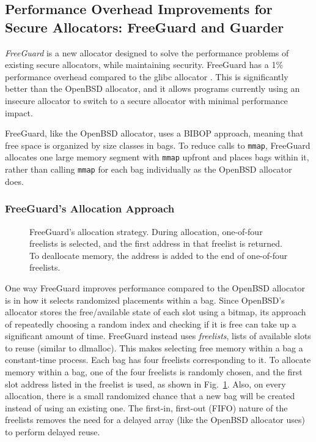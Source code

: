 \documentclass[conference]{IEEEtran}
\begin{document}
\subsection{Performance Overhead Improvements for Secure Allocators: FreeGuard and Guarder}


\emph{FreeGuard} is a new allocator designed to solve the performance problems of existing secure allocators, while maintaining security.
FreeGuard has a 1\% performance overhead compared to the glibc allocator \cite{guarder}.
This is significantly better than the OpenBSD allocator, and it allows programs currently using an insecure allocator to switch to a secure allocator with minimal performance impact.

FreeGuard, like the OpenBSD allocator, uses a BIBOP approach, meaning that free space is organized by size classes in bags.
To reduce calls to \verb|mmap|, FreeGuard allocates one large memory segment with \verb|mmap| upfront and places bags within it, rather than calling \verb|mmap| for each bag individually as the OpenBSD allocator does.

\subsubsection{FreeGuard's Allocation Approach}

\begin{figure}
	\def\svgwidth{3.5in}
	
	\caption{
		FreeGuard's allocation strategy.
		During allocation, one-of-four freelists is selected, and the first address in that freelist is returned.
		To deallocate memory, the address is added to the end of one-of-four freelists.
		\label{fig:freeguard_allocation}}
\end{figure}

One way FreeGuard improves performance compared to the OpenBSD allocator is in how it selects randomized placements within a bag.
Since OpenBSD's allocator stores the free/available state of each slot using a bitmap, its approach of repeatedly choosing a random index and checking if it is free can take up a significant amount of time.
FreeGuard instead uses \emph{freelists}, lists of available slots to reuse (similar to dlmalloc).
This makes selecting free memory within a bag a constant-time process.
Each bag has four freelists corresponding to it.
To allocate memory within a bag, one of the four freelists is randomly chosen, and the first slot address listed in the freelist is used, as shown in Fig.~\ref{fig:freeguard_allocation}.
Also, on every allocation, there is a small randomized chance that a new bag will be created instead of using an existing one.
The first-in, first-out (FIFO) nature of the freelists removes the need for a delayed array (like the OpenBSD allocator uses) to perform delayed reuse.
\end{document}

